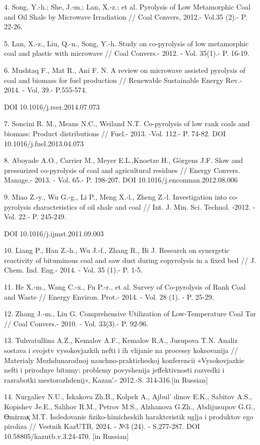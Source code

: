 4. Song, Y.-h.; She, J.-m.; Lan, X.-z.; et al. Pyrolysis of Low
Metamorphic Coal and Oil Shale by Microwave Irradiation // Coal Convers,
2012.- Vol.35 (2).- P. 22-26.

5. Lan, X.-z., Liu, Q.-n., Song, Y.-h. Study on co-pyrolysis of low
metamorphic coal and plastic with microwave // Coal Convers.- 2012. -
Vol. 35(1).- P. 16-19.

6. Mushtaq F., Mat R., Ani F. N. A review on microwave assisted
pyrolysis of coal and biomass for fuel production // Renewable
Sustainable Energy Rev.- 2014. - Vol. 39.- P.555-574.

DOI 10.1016/j.rser.2014.07.073

7. Soncini R. M., Means N.C., Weiland N.T. Co-pyrolysis of low rank
coals and biomass: Product distributions // Fuel.- 2013. -Vol. 112.- P.
74-82. DOI 10.1016/j.fuel.2013.04.073

8. Aboyade A.O., Carrier M., Meyer E.L.,Knoetze H., Görgens J.F. Slow
and pressurized co-pyrolysis of coal and agricultural residues // Energy
Convers. Manage.- 2013. - Vol. 65.- P. 198-207. DOI
10.1016/j.enconman.2012.08.006

9. Miao Z.-y., Wu G.-g., Li P., Meng X.-l., Zheng Z.-l. Investigation
into co-pyrolysis characteristics of oil shale and coal // Int. J. Min.
Sci. Technol. -2012. - Vol. 22.- P. 245-249.

DOI 10.1016/j.ijmst.2011.09.003

10. Liang P., Han Z.-h., Wu J.-f., Zhang R., Bi J. Research on
synergetic reactivity of bituminous coal and saw dust during copyrolysis
in a fixed bed // J. Chem. Ind. Eng.- 2014. - Vol. 35 (1).- P. 1-5.

11. He X.-m., Wang C.-x., Fu P.-r., et al. Survey of Co-pyrolysis of
Rank Coal and Waste // Energy Environ. Prot.- 2014. - Vol. 28 (1). - P.
25-29.

12. Zhang J.-m., Liu G. Comprehensive Utilization of Low-Temperature
Coal Tar // Coal Convers.- 2010. - Vol. 33(3).- P. 92-96.

13. Tuhvatullina A.Z., Kemalov A.F., Kemalov R.A., Jusupova T.N. Analiz
sostava i svojstv vysokovjazkih nefti i ih vlijanie na processy
koksovanija // Materialy Mezhdunarodnoj nauchno-prakticheskoj
konferencii «Vysokovjazkie nefti i prirodnye bitumy: problemy
povyshenija jeffektivnosti razvedki i razrabotki mestorozhdenij»,
Kazan'.- 2012.-S. 314-316.{[}in Russian{]}

14. Nurgaliev N.U., Iskakova Zh.B., Kolpek A.,
Ajbul' dinov E.K., Sabitov A.S., Kopishev Je.E., Salihov
R.M., Petrov M.S., Alzhanova G.Zh., Abdijusupov G.G., Өmіrzaқ M.T.
Issledovanie fiziko-himicheskih harakteristik uglja i produktov ego
piroliza // Vestnik KazUTB, 2024. - №3 (24). - S.277-287. DOI
10.58805/kazutb.v.3.24-470. {[}in Russian{]}

